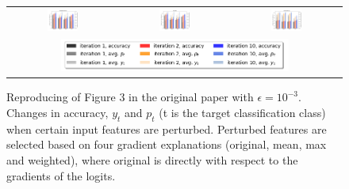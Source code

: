 \begin{figure}[h]
\begin{tabular}{c c c}
    \includegraphics[width = 0.3\textwidth]{figures/grad_sign_perturbation/mobilenetv3small_eps001.png} &
    \includegraphics[width = 0.3\textwidth]{figures/grad_sign_perturbation/mnasnet_eps001.png} &
    \includegraphics[width = 0.3\textwidth]{figures/grad_sign_perturbation/efficientnetB1_eps001.png} \\

\multicolumn{3}{c}{\includegraphics[width = 0.7\textwidth]{figures/grad_sign_perturbation/legend.png} }\\
\end{tabular}
\caption{Reproducing of Figure 3 in the original paper with $\epsilon=10^{-3}$. Changes in accuracy, $y_t$ and $p_t$ (t is the target classification class) when certain input features are perturbed. Perturbed features are selected based on four gradient explanations (original, mean, max and weighted), where original is directly with respect to the gradients of the logits.}
\label{f:grad_sign_perturbation_eps_001}
\end{figure}